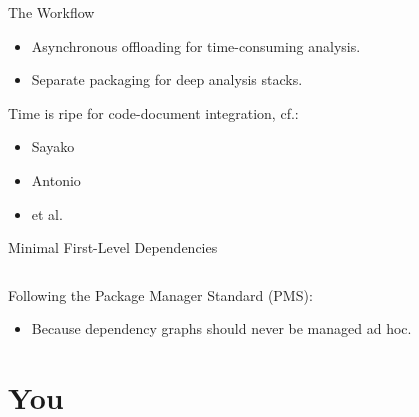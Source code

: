 			\begin{frame}{The Workflow}
				\begin{itemize}
					\item Asynchronous offloading for time-consuming analysis.
					\item Separate packaging for deep analysis stacks.
				\end{itemize}
				\vspace{-2em}
				\begin{figure}
					\centering
				\end{figure}
				\textcolor{vlg}{Time is ripe for code-document integration, cf.:}
				\begin{multicols}{3}
					\begin{itemize}
						\item \textcolor{vlg}{Sayako}
						\item \textcolor{vlg}{Antonio}
						\item \textcolor{vlg}{et al.}
					\end{itemize}
				\end{multicols}
			\end{frame}
			\begin{frame}{Minimal First-Level Dependencies}
				\inputminted[bgcolor=tlg,firstline=18,lastline=25]{bash}{.gentoo/app-text/repsep/repsep-99999.ebuild}
				Following the Package Manager Standard (PMS):
				\begin{itemize}
					\item Because dependency graphs should never be managed ad hoc.
				\end{itemize}
			\end{frame}
	\section{You}
